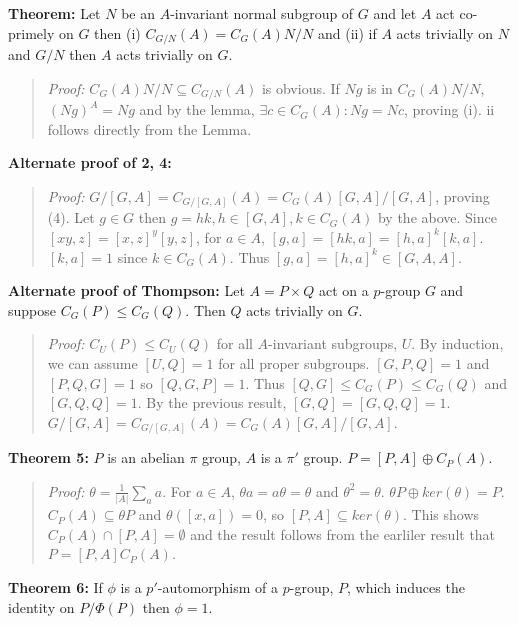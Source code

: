{\bf  Theorem:} Let $N$ be an $A$-invariant normal subgroup of $G$ and
let $A$ act co-primely on $G$ then (i)
$C_{G/N}(A)= C_G(A)N/N$ and
(ii) if $A$ acts trivially on $N$ and $G/N$ then $A$ acts trivially on $G$.
\begin{quote}
\emph{Proof:}  $C_G(A)N/N \subseteq C_{G/N}(A) $ is obvious.
If $Ng$ is in $C_G(A)N/N$, $(Ng)^A=Ng$ and by
the lemma, $\exists c \in C_G(A): Ng=Nc$, proving (i).  ii follows directly from the Lemma.
\end{quote}
{\bf Alternate proof of 2, 4:}
\begin{quote}
\emph{Proof:}
$G/[G,A] = C_{G/[G,A]}(A) = C_G(A)[G,A]/[G,A]$, proving (4).  
Let $g \in G$ then $g = hk, h \in [G,A], k \in C_G(A)$ by the above. 
Since $[xy, z]= [x,z]^y [y,z]$, for $a \in A$,
$[g,a]= [hk,a] = [h,a]^k [k,a]$.  $[k,a]=1$ since $k \in C_G(A)$.  Thus
$[g,a] = [h,a]^k \in [G,A,A]$.
\end{quote}
{\bf Alternate proof of Thompson:}  Let $A= P \times Q$ act on a $p$-group $G$ and suppose $C_G(P) \leq C_G(Q)$.  Then
$Q$ acts trivially on $G$.
\begin{quote}
\emph{Proof:}  $C_U(P) \leq C_U(Q)$ for all $A$-invariant subgroups, $U$.  By induction, we can assume
$[U,Q]=1$ for all proper subgroups.  $[G,P,Q]=1$ and $[P, Q, G] =1$ so $[Q, G, P]=1$.  Thus
$[Q,G] \leq C_G(P) \leq C_G(Q)$ and $[G,Q,Q] = 1$.  By the previous result, $[G,Q]=[G,Q,Q]=1$.
$G/[G,A] = C_{G/[G,A]}(A) = C_G(A)[G,A]/[G,A]$.  
\end{quote}
{\bf Theorem 5:} $P$ is an abelian $\pi$ group, $A$ is a $\pi'$ group.  $P= [P,A] \oplus C_P(A)$.
\begin{quote}
\emph{Proof:}
$\theta= {\frac 1 {|A|}} \sum_a a$.  For $a \in A$, $\theta a = a \theta = \theta$ and
$\theta^2= \theta$. $\theta P \oplus ker(\theta)= P$.  $C_P(A) \subseteq \theta P$ and
$\theta([x,a]) =0$, so $[P,A] \subseteq ker(\theta)$.  This shows $C_P(A) \cap [P,A] = \emptyset$
and the result follows from the earliler result that $P= [P,A] C_P(A)$.
\end{quote}
{\bf Theorem 6:}
If $\phi$ is a $p'$-automorphism of a $p$-group, $P$, which induces the identity on
$P/ \Phi(P)$ then $\phi= 1$.
